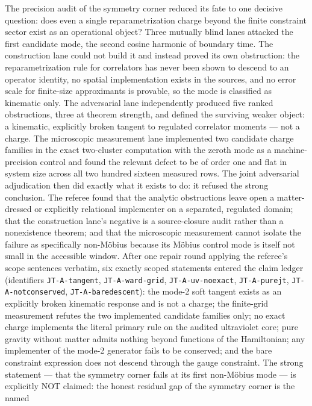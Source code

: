 The precision audit of the symmetry corner reduced its fate to one
decisive question: does even a single reparametrization charge beyond
the finite constraint sector exist as an operational object?  Three
mutually blind lanes attacked the first candidate mode, the second
cosine harmonic of boundary time.  The construction lane could not build
it and instead proved its own obstruction: the reparametrization rule
for correlators has never been shown to descend to an operator identity,
no spatial implementation exists in the sources, and no error scale for
finite-size approximants is provable, so the mode is classified as
kinematic only.  The adversarial lane independently produced five ranked
obstructions, three at theorem strength, and defined the surviving
weaker object: a kinematic, explicitly broken tangent to regulated
correlator moments --- not a charge.  The microscopic measurement lane
implemented two candidate charge families in the exact two-cluster
computation with the zeroth mode as a machine-precision control and
found the relevant defect to be of order one and flat in system size
across all two hundred sixteen measured rows.  The joint adversarial adjudication then did exactly what it exists to do:
it refused the strong conclusion. The referee found that the analytic
obstructions leave open a matter-dressed or explicitly relational
implementer on a separated, regulated domain; that the construction
lane's negative is a source-closure audit rather than a nonexistence
theorem; and that the microscopic measurement cannot isolate the failure
as specifically non-Möbius because its Möbius control mode is itself not
small in the accessible window. After one repair round applying the
referee's scope sentences verbatim, six exactly scoped statements entered
the claim ledger (identifiers \texttt{JT-A-tangent},
\texttt{JT-A-ward-grid}, \texttt{JT-A-uv-noexact}, \texttt{JT-A-purejt},
\texttt{JT-A-notconserved}, \texttt{JT-A-baredescent}): the mode-2 soft
tangent exists as an explicitly broken kinematic response and is not a
charge; the finite-grid measurement refutes the two implemented candidate
families only; no exact charge implements the literal primary rule on the
audited ultraviolet core; pure gravity without matter admits nothing
beyond functions of the Hamiltonian; any implementer of the mode-2
generator fails to be conserved; and the bare constraint expression does
not descend through the gauge constraint. The strong statement --- that
the symmetry corner fails at its first non-Möbius mode --- is explicitly
NOT claimed: the honest residual gap of the symmetry corner is the named
